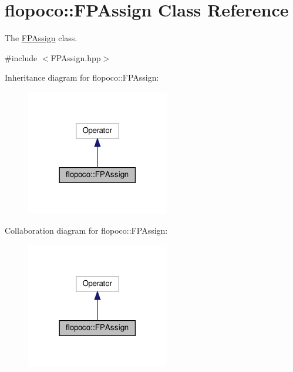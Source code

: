 \hypertarget{classflopoco_1_1FPAssign}{}\section{flopoco\+:\+:F\+P\+Assign Class Reference}
\label{classflopoco_1_1FPAssign}


The \hyperlink{classflopoco_1_1FPAssign}{F\+P\+Assign} class.  




{\ttfamily \#include $<$F\+P\+Assign.\+hpp$>$}



Inheritance diagram for flopoco\+:\+:F\+P\+Assign\+:
\nopagebreak
\begin{figure}[H]
\begin{center}
\leavevmode
\includegraphics[width=177pt]{d1/d56/classflopoco_1_1FPAssign__inherit__graph}
\end{center}
\end{figure}


Collaboration diagram for flopoco\+:\+:F\+P\+Assign\+:
\nopagebreak
\begin{figure}[H]
\begin{center}
\leavevmode
\includegraphics[width=177pt]{d2/dfc/classflopoco_1_1FPAssign__coll__graph}
\end{center}
\end{figure}
